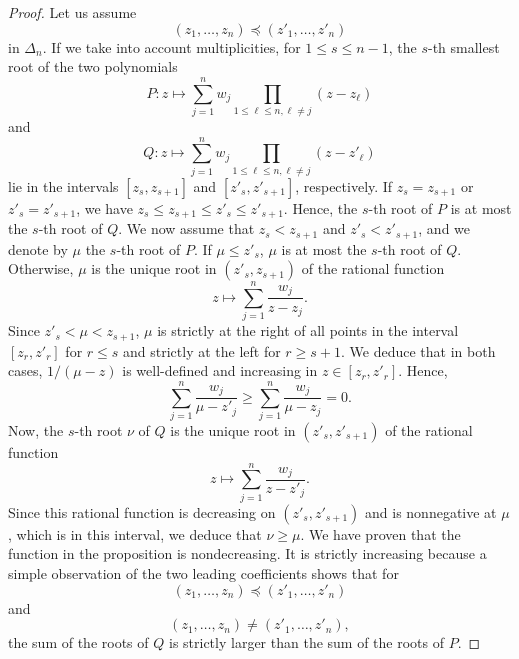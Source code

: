 \documentclass[10pt,a4paper]{amsart}
\begin{document}
\begin{proof}
Let us assume 
$$(z_1, \dots, z_n) \preccurlyeq (z'_1, \dots, z'_n)$$
in $\Delta_n$. 
If we take into account multiplicities, for $1 \leq s \leq n-1$, the $s$-th smallest root of the two polynomials 
$$P : z \mapsto \sum_{j=1}^n w_j \prod_{1 \leq \ell \leq n, \ell \neq j} (z - z_\ell)$$ 
and 
$$Q : z \mapsto \sum_{j=1}^n w_j \prod_{1 \leq \ell \leq n, \ell \neq j} (z - z'_\ell)$$ 
lie in the intervals $[z_s, z_{s+1}]$ and $[z'_s, z'_{s+1}]$, respectively. If $z_s = z_{s+1}$ or 
$z'_s = z'_{s+1}$, we have $z_s \leq z_{s+1} \leq z'_s \leq z'_{s+1}$. Hence, the $s$-th root of $P$ is at most 
the $s$-th root of $Q$. We now assume that $z_s < z_{s+1}$
and $z'_s < z'_{s+1}$, and we denote by $\mu$ the $s$-th root of $P$. If $\mu \leq z'_s$, $\mu$ is at most the $s$-th root of $Q$.
Otherwise, $\mu$ is the unique root in $(z'_s, z_{s+1})$
of the rational function 
$$z \mapsto \sum_{j=1}^n \frac{w_j}{z - z_j}.$$
Since $z'_s < \mu < z_{s+1}$, $\mu$ is strictly at the right 
of all points in the interval $[z_r, z'_r]$ for $r \leq s$ and strictly 
at the left for $r \geq s+1$. We deduce that in both cases,
$1/(\mu - z)$ is well-defined and increasing in $z \in [z_r, z'_r]$. Hence, 
$$ \sum_{j = 1}^n \frac{w_j}{ \mu - z'_j} \geq
\sum_{j = 1}^n \frac{w_j}{ \mu - z_j}  = 0.$$
Now, the $s$-th root $\nu$ of $Q$ is the unique root
in $(z'_s , z'_{s+1})$ of the rational function
$$z \mapsto \sum_{j=1}^n \frac{w_j}{z - z'_j}.$$
Since this rational function is decreasing on $(z'_s , z'_{s+1})$ and is nonnegative at $\mu$, which is in this interval, 
we deduce that $\nu \geq \mu$. 
We have proven that the function in the proposition is nondecreasing. 
It is strictly increasing because a simple observation of the two leading coefficients shows that for 
 $$(z_1, \dots, z_n) \preccurlyeq (z'_1, \dots, z'_n)$$ 
 and 
 $$(z_1, \dots, z_n) \neq (z'_1, \dots, z'_n),$$
the sum of the roots of $Q$ is strictly larger than the sum of the roots of $P$. 


\end{proof}
\end{document}
